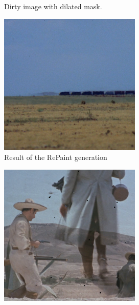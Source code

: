 \documentclass[openany, 12pt]{article}
\begin{document}
{\begin{figure}[htbp]
\begin{minipage}{0.45\textwidth}
		\caption{\smaller Dirty image with dilated mask.}
	\end{minipage}
	\hspace{0.05\textwidth}
	\begin{minipage}{0.45\textwidth}
		\centering
		\includegraphics[width=\textwidth]{images/inpainted_2.png}
		\caption{Result of the RePaint generation}
	\end{minipage}
\end{figure}
\begin{figure}[htbp]
	\centering
	\begin{minipage}{0.45\textwidth}
		\centering
		\includegraphics[width=\textwidth]{images/masked_4.png}

\end{minipage}
\end{figure}}
\end{document}
